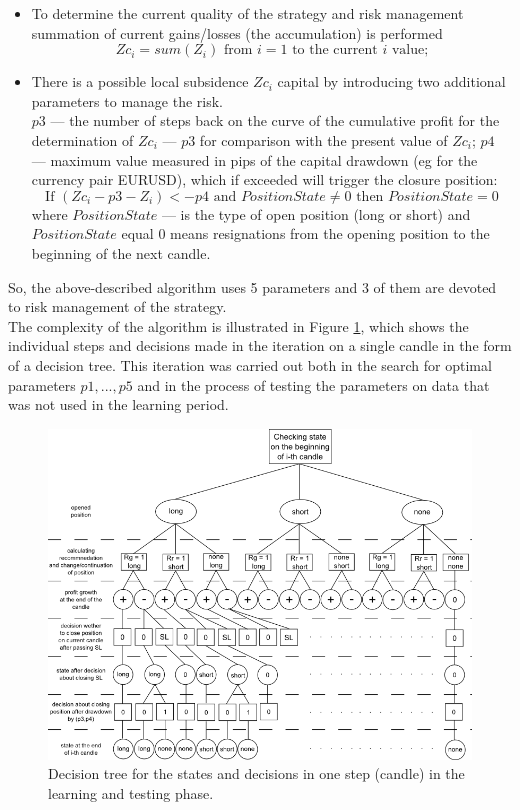 \documentclass[runningheads,a4paper]{llncs}
\begin{document}
\begin{itemize}
\item To determine the current quality of the strategy and risk management summation of current gains/losses (the accumulation) is performed
\begin{equation}
Zc_i = sum ( Z_i ) \text{ from } i = 1 \text{ to the current } i \text{ value;}
\end{equation}
\item There is a possible local subsidence $Zc_i$ capital by introducing two additional parameters to manage the risk.\\
$p3$ --- the number of steps back on the curve of the cumulative profit for the determination of $Zc_i$ --- $p3$ for comparison with the present value of $Zc_i$;
$p4$ --- maximum value measured in pips of the capital drawdown (eg for the currency pair EURUSD), which if exceeded will trigger the closure position:\\
\begin{equation}
\text{If } ( Zc_i - p3 - Z_i ) <- p4 \text{ and } PositionState \neq 0 \text{ then } PositionState = 0
\end{equation} 
where $PositionState$ --- is the type of open position (long or short) and $PositionState$ equal 0 means resignations from the opening position to the beginning of the next candle.
\end{itemize}
So, the above-described algorithm uses 5 parameters and 3 of them are devoted to risk management of the strategy.\\
The complexity of the algorithm is illustrated in Figure \ref{fig:fig7}, which shows the individual steps and decisions made in the iteration on a single candle in the form of a decision tree. This iteration was carried out both in the search for optimal parameters $p1, ..., p5$ and in the process of testing the parameters on data that was not used in the learning period.
\begin{figure}[h!]
\centering
\includegraphics[width = \textwidth]{figures/rys7.png}
\caption{Decision tree for the states and decisions in one step (candle) in the learning and testing phase.}
\label{fig:fig7}
\end{figure}
\FloatBarrier
\end{document}

